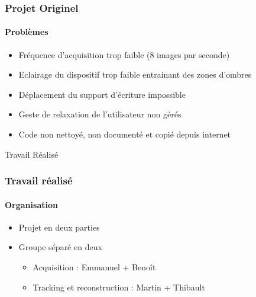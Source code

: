 \documentclass[12pt]{beamer}
\begin{document}
\begin{frame}
\frametitle{Projet Originel}
\framesubtitle{Problèmes}
\begin{itemize}
\item Fréquence d'acquisition trop faible (8 images par seconde)
\item Eclairage du dispositif trop faible entrainant des zones d'ombres
\item Déplacement du support d'écriture impossible
\item Geste de relaxation de l'utilisateur non gérés
\item Code non nettoyé, non documenté et copié depuis internet
\end{itemize}
\end{frame}

\begin{frame}
\Huge{\centerline{Travail Réalisé}}
\end{frame}

\begin{frame}
\frametitle{Travail réalisé}
\framesubtitle{Organisation}
\begin{itemize}
\item Projet en deux parties
\item Groupe séparé en deux
	\begin{itemize}
	\item Acquisition : Emmanuel + Benoît
	\item Tracking et reconstruction : Martin + Thibault
	\end{itemize}
\end{itemize}
\end{frame}
\end{document}
